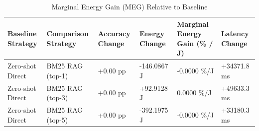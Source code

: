 \begin{table}
\caption{Marginal Energy Gain (MEG) Relative to Baseline}
\label{tab:marginal_energy_gain}
\begin{tabular}{llllll}
\toprule
Baseline Strategy & Comparison Strategy & Accuracy Change & Energy Change & Marginal Energy Gain (\% / J) & Latency Change \\
\midrule
Zero-shot Direct & BM25 RAG (top-1) & +0.00 pp & -146.0867 J & -0.0000 \%/J & +34371.8 ms \\
Zero-shot Direct & BM25 RAG (top-3) & +0.00 pp & +92.9128 J & 0.0000 \%/J & +49633.3 ms \\
Zero-shot Direct & BM25 RAG (top-5) & +0.00 pp & -392.1975 J & -0.0000 \%/J & +33180.3 ms \\
\bottomrule
\end{tabular}
\end{table}

